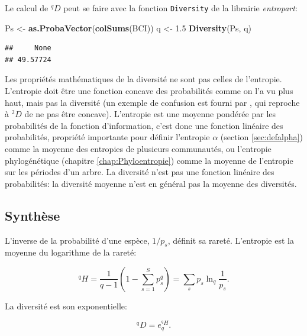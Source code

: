 \documentclass[
  11pt,
  french,
  a4paper,
  extrafontsizes,onecolumn,openright
  ]{memoir}
\newenvironment{Shaded}{\begin{snugshade}}{\end{snugshade}}
\newcommand{\FloatTok}[1]{\textcolor[rgb]{0.00,0.00,0.81}{#1}}
\newcommand{\KeywordTok}[1]{\textcolor[rgb]{0.13,0.29,0.53}{\textbf{#1}}}
\newcommand{\NormalTok}[1]{#1}
\newcommand{\StringTok}[1]{\textcolor[rgb]{0.31,0.60,0.02}{#1}}
\begin{document}
Le calcul de \(^{q}\!D\) peut se faire avec la fonction \texttt{Diversity} de la librairie \emph{entropart}:

\scriptsize

\begin{Shaded}
\begin{Highlighting}[]
\NormalTok{Ps <-}\StringTok{ }\KeywordTok{as.ProbaVector}\NormalTok{(}\KeywordTok{colSums}\NormalTok{(BCI))}
\NormalTok{q <-}\StringTok{ }\FloatTok{1.5}
\KeywordTok{Diversity}\NormalTok{(Ps, q)}
\end{Highlighting}
\end{Shaded}

\begin{verbatim}
##     None 
## 49.57724
\end{verbatim}

\normalsize

Les propriétés mathématiques de la diversité ne sont pas celles de l'entropie.
L'entropie doit être une fonction concave des probabilités comme on l'a vu plus haut, mais pas la diversité (un exemple de confusion est fourni par \textcite{Gadagkar1989}, qui reproche à \(^{2}\!D\) de ne pas être concave).
L'entropie est une moyenne pondérée par les probabilités de la fonction d'information, c'est donc une fonction linéaire des probabilités, propriété importante pour définir l'entropie \(\alpha\) (section \ref{sec:defalpha}) comme la moyenne des entropies de plusieurs communautés, ou l'entropie phylogénétique (chapitre \ref{chap:Phyloentropie}) comme la moyenne de l'entropie sur les périodes d'un arbre.
La diversité n'est pas une fonction linéaire des probabilités: la diversité moyenne n'est en général pas la moyenne des diversités.

\hypertarget{synthuxe8se}{%
\subsection{Synthèse}\label{synthuxe8se}}

L'inverse de la probabilité d'une espèce, \(1/p_s\), définit sa rareté.
L'entropie est la moyenne du logarithme de la rareté:

\begin{equation}
  \label{eq:EntropieRarete}
  ^{q}\!H = \frac{1}{q-1}\left(1-\sum^S_{s=1}{p^q_s}\right)=\sum_s{p_s}\ln_q\frac{1}{p_s}.
\end{equation}

La diversité est son exponentielle:

\begin{equation}
  \label{eq:DexpHSynthese}
  ^{q}\!D = e_q^{^{q}\!H}.
\end{equation}
\end{document}
